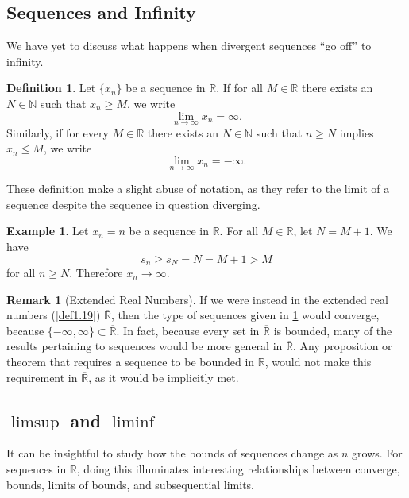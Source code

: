 \documentclass{article}
\newcommand{\N}{\mathbb{N}}
\newcommand{\R}{\mathbb{R}}
\theoremstyle{definition}
\newtheorem{definition}{Definition}[section]
\newtheorem{example}{Example}[section]
\newtheorem{remark}{Remark}[section]
\begin{document}
	\subsection{Sequences and Infinity}
	We have yet to discuss what happens when divergent sequences ``go off'' to infinity. 
	\begin{definition}\label{def3.10}
		Let $ \{x_n\} $ be a sequence in $ \R $. If for all $ M\in\R $ there exists an $ N\in\N $ such that $ x_n\ge M $, we write $$\lim\limits_{n\to\infty}x_n=\infty .$$ Similarly, if for every $ M\in\R $ there exists an $ N\in\N $ such that $ n\ge N $ implies $ x_n\le M $, we write $$\lim\limits_{n\to\infty}x_n=-\infty .$$
	\end{definition}
	These definition make a slight abuse of notation, as they refer to the limit of a sequence despite the sequence in question diverging. 
	\begin{example}
		Let $ x_n=n $ be a sequence in $ \R $. For all $ M\in\R $, let $ N=M+1 $. We have $$s_n\ge s_{N}=N=M+1>M $$ for all $ n\ge N $. Therefore $ x_n\to\infty $.
	\end{example}
	\begin{remark}[Extended Real Numbers]
		If we were instead in the extended real numbers (\cref{def1.19}) $ \overline{\R} $, then the type of sequences given in \cref{def3.10} would converge, because $ \{-\infty,\infty\}\subset\overline{\R} $. In fact, because every set in $ \overline{\R} $ is bounded, many of the results pertaining to sequences would be more general in $ \overline{\R} $. Any proposition or theorem that requires a sequence to be bounded in $ \R $, would not make this requirement in $ \overline{\R} $, as it would be implicitly met. 
	\end{remark}
	\subsection{$ \limsup $ and $ \liminf $}
	It can be insightful to study how the bounds of sequences change as $ n $ grows. For sequences in $ \R $, doing this illuminates interesting relationships between converge, bounds, limits of bounds, and subsequential limits. 
	
\end{document}
